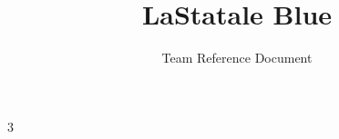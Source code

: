 \documentclass[8pt,a4paper,landscape,oneside]{amsart}
\title{LaStatale Blue}
\subtitle{Team Reference Document}
\date{\ddmmyyyydate{\today{}}}
\begin{document}
\begin{multicols*}{3}
\maketitle
\thispagestyle{fancy}
\vspace{-3em}
\tableofcontents




\end{multicols*}
\end{document}
